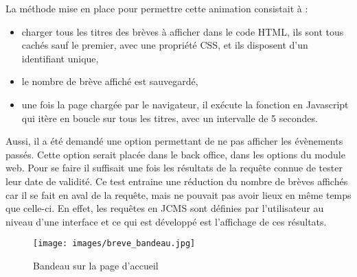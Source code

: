 \documentclass[12pt,a4paper]{article}
\begin{document}
La méthode mise en place pour permettre cette animation consistait à :
\begin{itemize}
\item charger tous les titres des brèves à afficher dans le code HTML, ils sont tous cachés sauf le premier, avec une propriété CSS, et ils disposent d'un identifiant unique,
\item le nombre de brève affiché est sauvegardé,
\item une fois la page chargée par le navigateur, il exécute la fonction en Javascript qui itère en boucle sur tous les titres, avec un intervalle de 5 secondes.
\end{itemize}
Aussi, il a été demandé une option permettant de ne pas afficher les évènements passés. Cette option serait placée dans le back office, dans les options du module web. Pour se faire il suffisait une fois les résultats de la requête connue de tester leur date de validité. Ce test entraine une réduction du nombre de brèves affichés car il se fait en aval de la requête, mais ne pouvait pas avoir lieux en même temps que celle-ci. En effet, les requêtes en \gls{JCMS} sont définies par l'utilisateur au niveau d'une interface et ce qui est développé est l'affichage de ces résultats.\par
\begin{figure}[h!]
\centering\texttt{[image: images/breve\_bandeau.jpg]} 
\caption{Bandeau sur la page d'accueil}
\end{figure}
\end{document}
